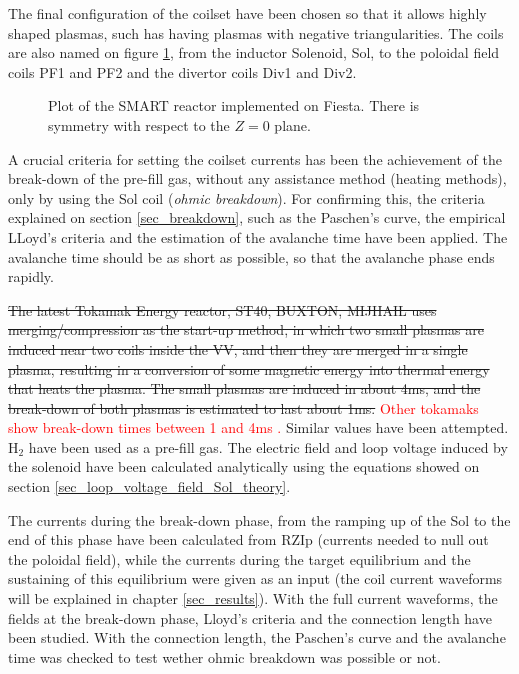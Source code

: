 \documentclass[a4paper,12pt,oneside]{book}
\begin{document}
The final configuration of the coilset have been chosen so that it allows highly shaped plasmas, such has having plasmas with negative triangularities. The coils are also named on figure \ref{fig_SMART_3D_2D}, from the inductor Solenoid, Sol, to the poloidal field coils PF1 and PF2 and the divertor coils Div1 and Div2.


\begin{figure}[htbp]
\centering
{}
\hfill
{}
\caption{Plot of the SMART reactor implemented on Fiesta. There is symmetry with respect to the $Z=0$ plane.}
\label{fig_SMART_3D_2D}
\end{figure}

A crucial criteria for setting the coilset currents has been the achievement of the break-down of the pre-fill gas, without any assistance method (heating methods), only by using the Sol coil (\textit{ohmic breakdown}). For confirming this, the criteria explained on section \ref{sec_breakdown}, such as the Paschen's curve, the empirical LLoyd's criteria and the estimation of the avalanche time have been applied. The avalanche time should be as short as possible, so that the avalanche phase ends rapidly. 

\st{The latest Tokamak Energy reactor, ST40, BUXTON, MIJHAIL uses merging/compression as the start-up method, in which two small plasmas are induced near two coils inside the VV, and then they are merged in a single plasma, resulting in a conversion of some magnetic energy into thermal energy that heats the plasma. The small plasmas are induced in about 4ms, and the break-down of both plasmas is estimated to last about 1ms.}
%
\textcolor{red}{Other tokamaks show break-down times between 1 and 4ms \cite{Buxton_results, NSTX_2017}.}
%
Similar values have been attempted. H$_2$ have been used as a pre-fill gas. The electric field and loop voltage induced by the solenoid have been calculated analytically using the equations showed on section \ref{sec_loop_voltage_field_Sol_theory}.

The currents during the break-down phase, from the ramping up of the Sol to the end of this phase have been calculated from RZIp (currents needed to null out the poloidal field), while the currents during the target equilibrium and the sustaining of this equilibrium were given as an input (the coil current waveforms will be explained in chapter \ref{sec_results}). With the full current waveforms, the fields at the break-down phase, Lloyd's criteria and the connection length have been studied. With the connection length, the Paschen's curve and the avalanche time was checked to test wether ohmic breakdown was possible or not.
\end{document}
